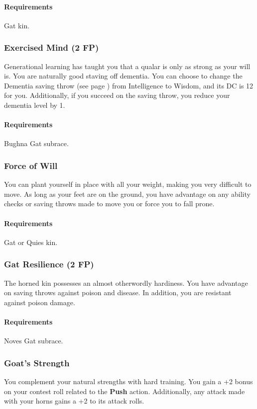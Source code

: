         \paragraph{Requirements} Gat kin.
    \subsubsection{Exercised Mind (2 FP)} \label{feat::exercisedmind}
        Generational learning has taught you that a qualar is only as strong as your will is.
        You are naturally good staving off dementia.
        You can choose to change the Dementia saving throw (see page \pageref{ssec::dementia}) from Intelligence to Wisdom, and its DC is 12 for you.
        Additionally, if you succeed on the saving throw, you reduce your dementia level by 1.
        \paragraph{Requirements} Bughna Gat subrace.
    \subsubsection{Force of Will} \label{feat::forceofwill}
        You can plant yourself in place with all your weight, making you very difficult to move.
        As long as your feet are on the ground, you have advantage on any ability checks or saving throws made to move you or force you to fall prone.
        \paragraph{Requirements} Gat or Quies kin.
    \subsubsection{Gat Resilience (2 FP)} \label{feat::gatresilience}
        The horned kin possesses an almost otherwordly hardiness.
        You have advantage on saving throws against poison and disease.
        In addition, you are resistant against poison damage.
        \paragraph{Requirements} Noves Gat subrace.
    \subsubsection{Goat's Strength} \label{feat::goatsstrength}
        You complement your natural strengths with hard training.
        You gain a +2 bonus on your contest roll related to the \textbf{Push} action.
        Additionally, any attack made with your horns gains a +2 to its attack rolls.

